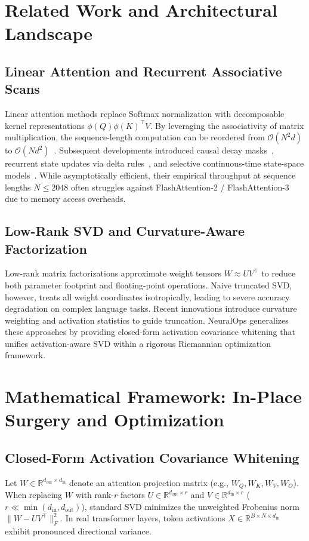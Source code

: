 \documentclass{article}
\begin{document}
\section{Related Work and Architectural Landscape}
\label{sec:related_work}

\subsection{Linear Attention and Recurrent Associative Scans}
Linear attention methods replace Softmax normalization with decomposable kernel representations $\phi(Q) \phi(K)^\top V$. By leveraging the associativity of matrix multiplication, the sequence-length computation can be reordered from $\mathcal{O}(N^2 d)$ to $\mathcal{O}(N d^2)$~\citep{katharopoulos2020transformers}. Subsequent developments introduced causal decay masks~\citep{sun2023retentive}, recurrent state updates via delta rules~\citep{schlag2021deltanet}, and selective continuous-time state-space models~\citep{gu2023mamba}. While asymptotically efficient, their empirical throughput at sequence lengths $N \le 2048$ often struggles against FlashAttention-2 / FlashAttention-3~\citep{dao2022flashattention,dao2023flashattention2,dao2024flash3} due to memory access overheads.

\subsection{Low-Rank SVD and Curvature-Aware Factorization}
Low-rank matrix factorizations approximate weight tensors $W \approx U V^\top$ to reduce both parameter footprint and floating-point operations. Naive truncated SVD, however, treats all weight coordinates isotropically, leading to severe accuracy degradation on complex language tasks. Recent innovations introduce curvature weighting and activation statistics to guide truncation. NeuralOps generalizes these approaches by providing closed-form activation covariance whitening that unifies activation-aware SVD within a rigorous Riemannian optimization framework.

\section{Mathematical Framework: In-Place Surgery and Optimization}
\label{sec:math_framework}

\subsection{Closed-Form Activation Covariance Whitening}
Let $W \in \mathbb{R}^{d_{\text{out}} \times d_{\text{in}}}$ denote an attention projection matrix (e.g., $W_Q, W_K, W_V, W_O$). When replacing $W$ with rank-$r$ factors $U \in \mathbb{R}^{d_{\text{out}} \times r}$ and $V \in \mathbb{R}^{d_{\text{in}} \times r}$ ($r \ll \min(d_{\text{in}}, d_{\text{out}})$), standard SVD minimizes the unweighted Frobenius norm $\|W - U V^\top\|_F^2$. In real transformer layers, token activations $X \in \mathbb{R}^{B \times N \times d_{\text{in}}}$ exhibit pronounced directional variance.
\end{document}
